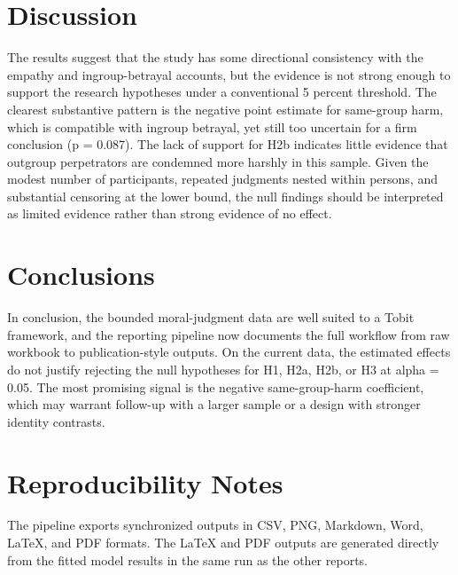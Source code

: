 \documentclass[11pt]{article}
\begin{document}
\section{Discussion}
The results suggest that the study has some directional consistency with the empathy and ingroup-betrayal accounts, but the evidence is not strong enough to support the research hypotheses under a conventional 5 percent threshold. The clearest substantive pattern is the negative point estimate for same-group harm, which is compatible with ingroup betrayal, yet still too uncertain for a firm conclusion (p = 0.087). The lack of support for H2b indicates little evidence that outgroup perpetrators are condemned more harshly in this sample. Given the modest number of participants, repeated judgments nested within persons, and substantial censoring at the lower bound, the null findings should be interpreted as limited evidence rather than strong evidence of no effect.
\section{Conclusions}
In conclusion, the bounded moral-judgment data are well suited to a Tobit framework, and the reporting pipeline now documents the full workflow from raw workbook to publication-style outputs. On the current data, the estimated effects do not justify rejecting the null hypotheses for H1, H2a, H2b, or H3 at alpha = 0.05. The most promising signal is the negative same-group-harm coefficient, which may warrant follow-up with a larger sample or a design with stronger identity contrasts.
\section{Reproducibility Notes}
The pipeline exports synchronized outputs in CSV, PNG, Markdown, Word, LaTeX, and PDF formats. The LaTeX and PDF outputs are generated directly from the fitted model results in the same run as the other reports.
\end{document}
